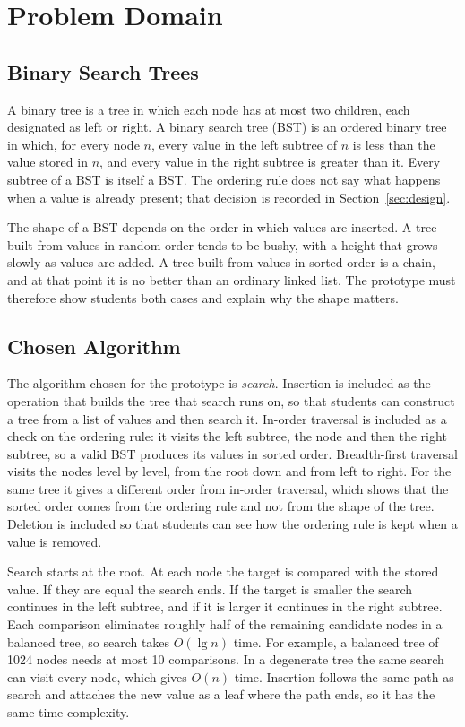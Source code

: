 \section{Problem Domain}\label{sec:problem}


\subsection{Binary Search Trees}
A binary tree is a tree in which each node has at most two children, each designated as left or right. A binary search tree (BST) is an ordered binary tree in which, for every node $n$, every value in the left subtree of $n$ is less than the value stored in $n$, and every value in the right subtree is greater than it. Every subtree of a BST is itself a BST. The ordering rule does not say what happens when a value is already present; that decision is recorded in Section~\ref{sec:design}.

The shape of a BST depends on the order in which values are inserted. A tree built from values in random order tends to be bushy, with a height that grows slowly as values are added. A tree built from values in sorted order is a chain, and at that point it is no better than an ordinary linked list. The prototype must therefore show students both cases and explain why the shape matters.

\subsection{Chosen Algorithm}
The algorithm chosen for the prototype is \emph{search}. Insertion is included as the operation that builds the tree that search runs on, so that students can construct a tree from a list of values and then search it. In-order traversal is included as a check on the ordering rule: it visits the left subtree, the node and then the right subtree, so a valid BST produces its values in sorted order. Breadth-first traversal visits the nodes level by level, from the root down and from left to right. For the same tree it gives a different order from in-order traversal, which shows that the sorted order comes from the ordering rule and not from the shape of the tree. Deletion is included so that students can see how the ordering rule is kept when a value is removed.

Search starts at the root. At each node the target is compared with the stored value. If they are equal the search ends. If the target is smaller the search continues in the left subtree, and if it is larger it continues in the right subtree. Each comparison eliminates roughly half of the remaining candidate nodes in a balanced tree, so search takes $O(\lg n)$ time. For example, a balanced tree of 1024 nodes needs at most 10 comparisons. In a degenerate tree the same search can visit every node, which gives $O(n)$ time. Insertion follows the same path as search and attaches the new value as a leaf where the path ends, so it has the same time complexity.

